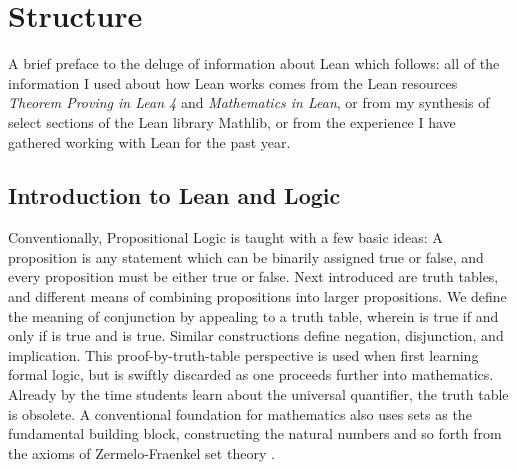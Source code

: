 

\chapter{Structure}

A brief preface to the deluge of information about Lean which follows:
all of the information I used about how Lean works comes from the Lean 
resources \textit{Theorem Proving in Lean 4}\cite{TPiL} and 
\textit{Mathematics in Lean}\cite{MIL}, or from my synthesis of select
sections of the Lean library Mathlib, or from the experience
I have gathered working with Lean for the past year.

\section{Introduction to Lean and Logic}

Conventionally, Propositional Logic is taught with a few basic ideas:
A proposition is any statement which can be binarily assigned true or 
false, and every proposition must be either true or false. Next introduced 
are truth tables, and different means of combining propositions into 
larger propositions. We define the meaning of conjunction by appealing to 
a truth table, wherein  is true if and only if  is true 
and  is true. Similar constructions define negation, disjunction, 
and implication. This proof-by-truth-table perspective is used when
first learning formal logic, but is swiftly discarded as one proceeds
further into mathematics. Already by the time students learn 
about the universal quantifier, the truth table is obsolete.
A conventional foundation for mathematics also uses sets as the 
fundamental building block, constructing the natural numbers and so 
forth from the axioms of Zermelo-Fraenkel set theory \cite{RealAnalysis}.

